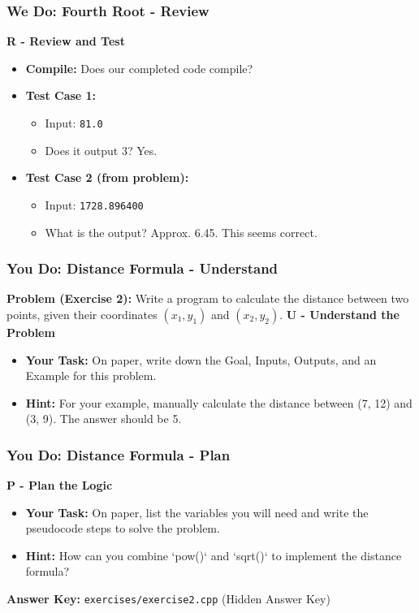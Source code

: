 \documentclass{beamer}
\begin{document}
\begin{frame}
\frametitle{We Do: Fourth Root - Review}
\textbf{R - Review and Test}
\begin{itemize}
    \item \textbf{Compile:} Does our completed code compile?
    \item \textbf{Test Case 1:}
    \begin{itemize}
        \item Input: \texttt{81.0}
        \item Does it output 3? \pause Yes.
    \end{itemize}
    \item \textbf{Test Case 2 (from problem):}
    \begin{itemize}
        \item Input: \texttt{1728.896400}
        \item What is the output? \pause Approx. 6.45. This seems correct.
    \end{itemize}
\end{itemize}
\end{frame}

\begin{frame}
\frametitle{You Do: Distance Formula - Understand}
\textbf{Problem (Exercise 2):} Write a program to calculate the distance between two points, given their coordinates $(x_1, y_1)$ and $(x_2, y_2)$.
\vfill
\textbf{U - Understand the Problem}
\begin{itemize}
    \item \textbf{Your Task:} On paper, write down the Goal, Inputs, Outputs, and an Example for this problem.
    \item \textbf{Hint:} For your example, manually calculate the distance between (7, 12) and (3, 9). The answer should be 5.
\end{itemize}
\end{frame}

\begin{frame}
\frametitle{You Do: Distance Formula - Plan}
\textbf{P - Plan the Logic}
\begin{itemize}
    \item \textbf{Your Task:} On paper, list the variables you will need and write the pseudocode steps to solve the problem.
    \item \textbf{Hint:} How can you combine `pow()` and `sqrt()` to implement the distance formula?
\end{itemize}
\textbf{Answer Key:} \texttt{exercises/exercise2.cpp} (Hidden Answer Key)
\end{frame}
\end{document}
